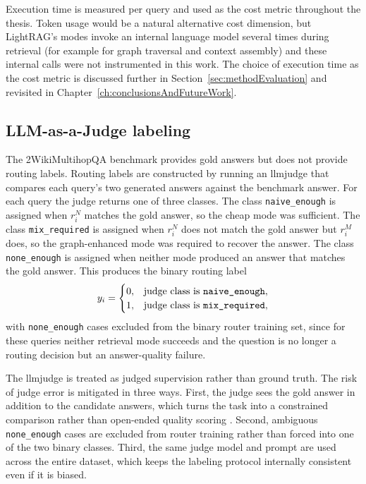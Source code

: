 \documentclass[english, bibtex]{kththesis}               %
\numberwithin{listing}{chapter}
\begin{document}
Execution time is measured per query and used as the cost metric throughout the thesis. Token usage would be a natural alternative cost dimension, but LightRAG's modes invoke an internal language model several times during retrieval (for example for graph traversal and context assembly) and these internal calls were not instrumented in this work. The choice of execution time as the cost metric is discussed further in Section~\ref{sec:methodEvaluation} and revisited in Chapter~\ref{ch:conclusionsAndFutureWork}.

\subsection{LLM-as-a-Judge labeling}
\label{sec:methodJudge}

The 2WikiMultihopQA benchmark provides gold answers but does not provide routing labels. Routing labels are constructed by running an \gls{llmjudge} \cite{zheng2023judge} that compares each query's two generated answers against the benchmark answer. For each query the judge returns one of three classes. The class \texttt{naive\_enough} is assigned when \(r_i^N\) matches the gold answer, so the cheap mode was sufficient. The class \texttt{mix\_required} is assigned when \(r_i^N\) does not match the gold answer but \(r_i^M\) does, so the graph-enhanced mode was required to recover the answer. The class \texttt{none\_enough} is assigned when neither mode produced an answer that matches the gold answer.
This produces the binary routing label
\begin{equation}
\label{eq:routingLabel}
y_i =
\begin{cases}
0, & \text{judge class is \texttt{naive\_enough}},\\
1, & \text{judge class is \texttt{mix\_required}},
\end{cases}
\end{equation}
with \texttt{none\_enough} cases excluded from the binary router training set, since for these queries neither retrieval mode succeeds and the question is no longer a routing decision but an answer-quality failure.

The \gls{llmjudge} is treated as judged supervision rather than ground truth. The risk of judge error is mitigated in three ways. First, the judge sees the gold answer in addition to the candidate answers, which turns the task into a constrained comparison rather than open-ended quality scoring \cite{zheng2023judge}. Second, ambiguous \texttt{none\_enough} cases are excluded from router training rather than forced into one of the two binary classes. Third, the same judge model and prompt are used across the entire dataset, which keeps the labeling protocol internally consistent even if it is biased.
\end{document}
